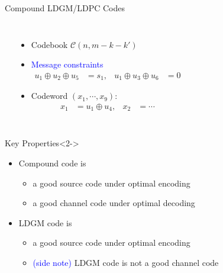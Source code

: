 \documentclass[10pt,presentation]{beamer}
\def\side_information_path{../compound-codes/isit14/slides/Figures}
\begin{document}
\begin{frame}{Compound LDGM/LDPC Codes}
\begin{columns}
 \begin{center}
    \setlength\tikzheight{5cm}
    \setlength\tikzwidth{6cm}
    \scalebox{0.5}{}
 \end{center}
    \begin{itemize}
    \item Codebook $\mathcal{C}(n,m-k-k')$ \vspace{0.1cm}
    \item \textcolor{blue}{Message constraints} \vspace{-0.2cm}
      \begin{align*}
        u_1\oplus u_2 \oplus u_5&=s_1, &  u_1\oplus u_3 \oplus u_6&=0
      \end{align*}
    \item Codeword $(x_1,\cdots,x_9)$: \vspace{-0.2cm}
      \begin{align*}
        x_1 &= u_1 \oplus u_4, & x_2 &= \cdots
      \end{align*}
    \end{itemize}
  \end{columns}
  \begin{block}{Key Properties}<2->
    \begin{itemize}
    \item Compound code is 
      \begin{itemize}
      \item a {\blue good source code} under optimal encoding
      \item a {\blue good channel code} under optimal decoding
      \end{itemize}
     \item LDGM code is 
       \begin{itemize}
       \item a {\blue good source code} under optimal encoding
       \item \textcolor{blue}{(side note)} LDGM code is \alert{not} a good channel code
       \end{itemize}
    \end{itemize}
  \end{block}
\end{frame}
\end{document}
